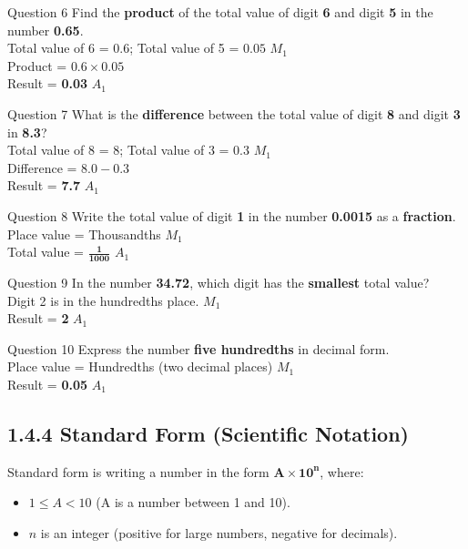 \documentclass[12pt, a4paper, oneside]{article}
\begin{document}
\begin{solvingbox}{Question 6}
Find the \textbf{product} of the total value of digit \textbf{6} and digit \textbf{5} in the number \textbf{0.65}. \\
Total value of 6 = $0.6$; Total value of 5 = $0.05$ \hfill $M_1$ \\
Product = $0.6 \times 0.05$ \\
Result = \textbf{0.03} \hfill $A_1$
\end{solvingbox}

\begin{solvingbox}{Question 7}
What is the \textbf{difference} between the total value of digit \textbf{8} and digit \textbf{3} in \textbf{8.3}? \\
Total value of 8 = 8; Total value of 3 = $0.3$ \hfill $M_1$ \\
Difference = $8.0 - 0.3$ \\
Result = \textbf{7.7} \hfill $A_1$
\end{solvingbox}

\begin{solvingbox}{Question 8}
Write the total value of digit \textbf{1} in the number \textbf{0.0015} as a \textbf{fraction}. \\
Place value = Thousandths \hfill $M_1$ \\
Total value = $\mathbf{\frac{1}{1000}}$ \hfill $A_1$
\end{solvingbox}

\begin{solvingbox}{Question 9}
In the number \textbf{34.72}, which digit has the \textbf{smallest} total value? \\
Digit 2 is in the hundredths place. \hfill $M_1$ \\
Result = \textbf{2} \hfill $A_1$
\end{solvingbox}

\begin{solvingbox}{Question 10}
Express the number \textbf{five hundredths} in decimal form. \\
Place value = Hundredths (two decimal places) \hfill $M_1$ \\
Result = \textbf{0.05} \hfill $A_1$
\end{solvingbox}
\subsection*{1.4.4 Standard Form (Scientific Notation)}

\begin{tcolorbox}[colback=lightgrey, colframe=primaryblue, title=\textbf{Concept Summary}, arc=5pt]
    Standard form is writing a number in the form $\mathbf{A \times 10^n}$, where:
    \begin{itemize}
        \item $1 \leq A < 10$ (A is a number between 1 and 10).
        \item $n$ is an integer (positive for large numbers, negative for decimals).
    \end{itemize}
\end{tcolorbox}
\end{document}
